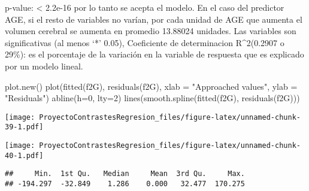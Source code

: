 \documentclass[
]{article}
\newenvironment{Shaded}{\begin{snugshade}}{\end{snugshade}}
\newcommand{\AttributeTok}[1]{\textcolor[rgb]{0.77,0.63,0.00}{#1}}
\newcommand{\DecValTok}[1]{\textcolor[rgb]{0.00,0.00,0.81}{#1}}
\newcommand{\FunctionTok}[1]{\textcolor[rgb]{0.00,0.00,0.00}{#1}}
\newcommand{\NormalTok}[1]{#1}
\newcommand{\SpecialCharTok}[1]{\textcolor[rgb]{0.00,0.00,0.00}{#1}}
\newcommand{\StringTok}[1]{\textcolor[rgb]{0.31,0.60,0.02}{#1}}
\begin{document}
p-value: \textless{} 2.2e-16 por lo tanto se acepta el modelo. En el
caso del predictor AGE, si el resto de variables no varían, por cada
unidad de AGE que aumenta el volumen cerebral se aumenta en promedio
13.88024 unidades. Las variables son significativas (al menos `*' 0.05),
Coeficiente de determinacion R\^{}2(0.2907 o 29\%): es el porcentaje de
la variación en la variable de respuesta que es explicado por un modelo
lineal.

\begin{Shaded}
\begin{Highlighting}[]
\FunctionTok{plot.new}\NormalTok{()}
\FunctionTok{plot}\NormalTok{(}\FunctionTok{fitted}\NormalTok{(f2G), }\FunctionTok{residuals}\NormalTok{(f2G), }\AttributeTok{xlab =} \StringTok{"Approached values"}\NormalTok{,  }\AttributeTok{ylab =} \StringTok{"Residuals"}\NormalTok{)}
  \FunctionTok{abline}\NormalTok{(}\AttributeTok{h=}\DecValTok{0}\NormalTok{, }\AttributeTok{lty=}\DecValTok{2}\NormalTok{)}
    \FunctionTok{lines}\NormalTok{(}\FunctionTok{smooth.spline}\NormalTok{(}\FunctionTok{fitted}\NormalTok{(f2G), }\FunctionTok{residuals}\NormalTok{(f2G)))}
\end{Highlighting}
\end{Shaded}

\texttt{[image: ProyectoContrastesRegresion\_files/figure-latex/unnamed-chunk-39-1.pdf]}

\begin{Shaded}
\end{Shaded}

\texttt{[image: ProyectoContrastesRegresion\_files/figure-latex/unnamed-chunk-40-1.pdf]}

\begin{Shaded}
\end{Shaded}

\begin{verbatim}
##     Min.  1st Qu.   Median     Mean  3rd Qu.     Max. 
## -194.297  -32.849    1.286    0.000   32.477  170.275
\end{verbatim}

\begin{Shaded}
\end{Shaded}
\end{document}

